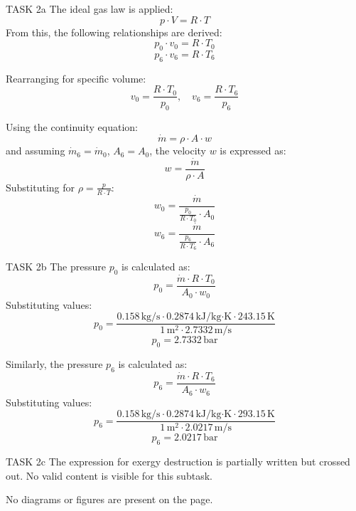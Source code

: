 TASK 2a  
The ideal gas law is applied:  
\[
p \cdot V = R \cdot T
\]  
From this, the following relationships are derived:  
\[
p_0 \cdot v_0 = R \cdot T_0
\]  
\[
p_6 \cdot v_6 = R \cdot T_6
\]  

Rearranging for specific volume:  
\[
v_0 = \frac{R \cdot T_0}{p_0}, \quad v_6 = \frac{R \cdot T_6}{p_6}
\]  

Using the continuity equation:  
\[
\dot{m} = \rho \cdot A \cdot w
\]  
and assuming \( \dot{m}_6 = \dot{m}_0 \), \( A_6 = A_0 \), the velocity \( w \) is expressed as:  
\[
w = \frac{\dot{m}}{\rho \cdot A}
\]  
Substituting for \( \rho = \frac{p}{R \cdot T} \):  
\[
w_0 = \frac{\dot{m}}{\frac{p_0}{R \cdot T_0} \cdot A_0}
\]  
\[
w_6 = \frac{\dot{m}}{\frac{p_6}{R \cdot T_6} \cdot A_6}
\]  

TASK 2b  
The pressure \( p_0 \) is calculated as:  
\[
p_0 = \frac{\dot{m} \cdot R \cdot T_0}{A_0 \cdot w_0}
\]  
Substituting values:  
\[
p_0 = \frac{0.158 \, \text{kg/s} \cdot 0.2874 \, \text{kJ/kg·K} \cdot 243.15 \, \text{K}}{1 \, \text{m}^2 \cdot 2.7332 \, \text{m/s}}
\]  
\[
p_0 = 2.7332 \, \text{bar}
\]  

Similarly, the pressure \( p_6 \) is calculated as:  
\[
p_6 = \frac{\dot{m} \cdot R \cdot T_6}{A_6 \cdot w_6}
\]  
Substituting values:  
\[
p_6 = \frac{0.158 \, \text{kg/s} \cdot 0.2874 \, \text{kJ/kg·K} \cdot 293.15 \, \text{K}}{1 \, \text{m}^2 \cdot 2.0217 \, \text{m/s}}
\]  
\[
p_6 = 2.0217 \, \text{bar}
\]  

TASK 2c  
The expression for exergy destruction is partially written but crossed out. No valid content is visible for this subtask.  

No diagrams or figures are present on the page.